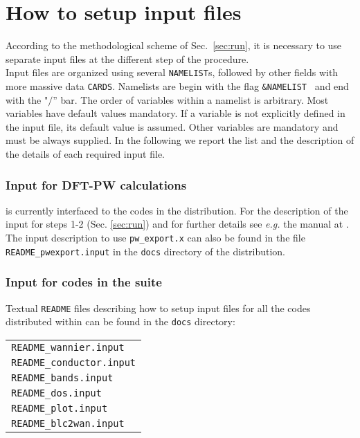 
\thispagestyle{empty}
\section{How to setup input files}\label{sec:input}

\noindent According to the methodological scheme of Sec.~\ref{sec:run},
it is necessary to use separate input files at
the different step of the \WANT{} procedure.\\

\noindent Input files are organized using several {\tt NAMELIST}s,
followed by other fields with more massive data {\tt CARDS}. Namelists are
begin with the flag {\tt \&NAMELIST } and end with the
"$/$'' bar. The order of variables within a namelist is
arbitrary. Most variables have default values mandatory.
If a variable is not explicitly defined in the input file,
its default value is assumed. Other variables are mandatory and must be
always supplied.
In the following we report the list and the description
of the details of each required input file.

\subsubsection{Input for DFT-PW calculations}
%
\noindent \WANT{} is currently interfaced to the codes in the \QUANTUMESPRESSO distribution. 
For the description of the input for steps 1-2 (Sec. \ref{sec:run})
and for further details see {\it e.g.} the \PWSCF{} manual at \PWSCFURL.\\
The input description to use {\tt pw\_export.x} can also be found 
in the file {\tt README\_pwexport.input} in the {\tt docs} directory of
the \WANT{} distribution.

%
\subsubsection{Input for codes in the \WANT{} suite}
%
\noindent
Textual {\tt README} files describing how to setup input files
for all the codes distributed within \WANT{} can be found in the 
{\tt docs} directory: \\

\begin{tabular}{@{\hspace{10pt}}l}
    {\tt README\_wannier.input}  \\
    {\tt README\_conductor.input} \\
    {\tt README\_bands.input} \\
    {\tt README\_dos.input} \\
    {\tt README\_plot.input} \\
    {\tt README\_blc2wan.input}  \\
\end{tabular}

